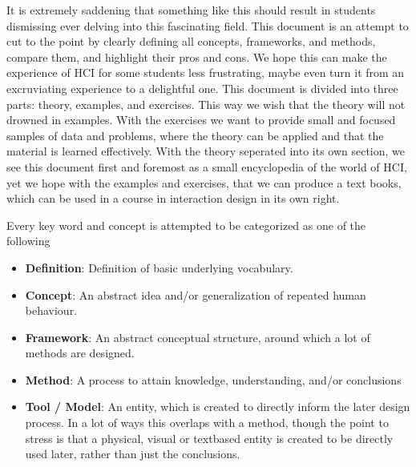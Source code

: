 It is extremely saddening that something like this should result in students dismissing ever delving into this fascinating field. This document is an attempt to cut to the point by clearly defining all concepts, frameworks, and methods, compare them, and highlight their pros and cons. We hope this can make the experience of HCI for some students less frustrating, maybe even turn it from an excruviating experience to a delightful one. This document is divided into three parts: theory, examples, and exercises. This way we wish that the theory will not drowned in examples. With the exercises we want to provide small and focused samples of data and problems, where the theory can be applied and that the material is learned effectively. With the theory seperated into its own section, we see this document first and foremost as a small encyclopedia of the world of HCI, yet we hope with the examples and exercises, that we can produce a text books, which can be used in a course in interaction design in its own right.

Every key word and concept is attempted to be categorized as one of the following
\begin{itemize}
   \item \textbf{Definition}: Definition of basic underlying vocabulary.

   \item \textbf{Concept}: An abstract idea and/or generalization of repeated human behaviour.

   \item \textbf{Framework}: An abstract conceptual structure, around which a lot of methods are designed.

   \item \textbf{Method}: A process to attain knowledge, understanding, and/or conclusions

   \item \textbf{Tool / Model}: An entity, which is created to directly inform the later design process. In a lot of ways this overlaps with a method, though the point to stress is that a physical, visual or textbased entity is created to be directly used later, rather than just the conclusions.
\end{itemize}
